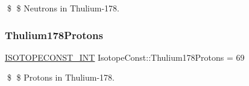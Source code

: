 \$ \$ Neutrons in Thulium-\/178. \mbox{\label{group___isotope_const-_thulium-_tm178_gad979fca0163bc8960ac981cb015235a8}} 
\subsubsection{\texorpdfstring{Thulium178\+Protons}{Thulium178Protons}}
{\footnotesize\ttfamily \mbox{\hyperlink{group___isotope_const-_macros_ga5f18360b3e99483a35c32d789e62621c}{I\+S\+O\+T\+O\+P\+E\+C\+O\+N\+S\+T\+\_\+\+I\+NT}} Isotope\+Const\+::\+Thulium178\+Protons = 69}

\$ \$ Protons in Thulium-\/178. 